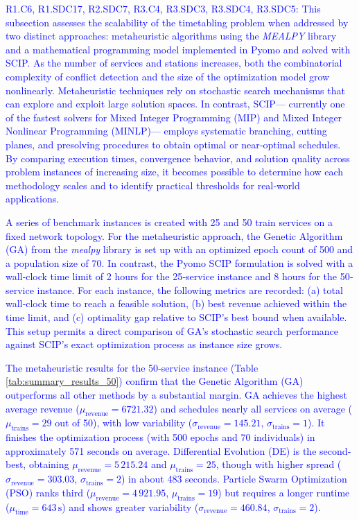 \documentclass[Afour,sagev,times]{sagej}
\newcommand{\primero}[1]{\textcolor{blue}{#1}}
\begin{document}
\primero{R1.C6, R1.SDC17, R2.SDC7, R3.C4, R3.SDC3, R3.SDC4, R3.SDC5: 
This subsection assesses the scalability of the timetabling problem when addressed by two distinct approaches: metaheuristic algorithms using the \textit{MEALPY} library and a mathematical programming model implemented in Pyomo and solved with \gls{SCIP}. As the number of services and stations increases, both the combinatorial complexity of conflict detection and the size of the optimization model grow nonlinearly. Metaheuristic techniques rely on stochastic search mechanisms that can explore and exploit large solution spaces. In contrast, SCIP— currently one of the fastest solvers for Mixed Integer Programming (MIP) and Mixed Integer Nonlinear Programming (MINLP)— employs systematic branching, cutting planes, and presolving procedures to obtain optimal or near‐optimal schedules. By comparing execution times, convergence behavior, and solution quality across problem instances of increasing size, it becomes possible to determine how each methodology scales and to identify practical thresholds for real‐world applications.
}

\primero{
A series of benchmark instances is created with 25 and 50 train services on a fixed network topology. For the metaheuristic approach, the Genetic Algorithm (GA) from the \textit{mealpy} library is set up with an optimized epoch count of 500 and a population size of 70. In contrast, the Pyomo SCIP formulation is solved with a wall‐clock time limit of 2 hours for the 25‐service instance and 8 hours for the 50‐service instance. For each instance, the following metrics are recorded: (a) total wall‐clock time to reach a feasible solution, (b) best revenue achieved within the time limit, and (c) optimality gap relative to SCIP’s best bound when available. This setup permits a direct comparison of GA’s stochastic search performance against SCIP’s exact optimization process as instance size grows.
}

\primero{
The metaheuristic results for the 50‐service instance (Table \ref{tab:summary_results_50}) confirm that the Genetic Algorithm (GA) outperforms all other methods by a substantial margin. GA achieves the highest average revenue (\(\mu_{\text{revenue}} = 6721.32\)) and schedules nearly all services on average (\(\mu_{\text{trains}} = 29\) out of 50), with low variability (\(\sigma_{\text{revenue}} = 145.21\), \(\sigma_{\text{trains}} = 1\)). It finishes the optimization process (with 500 epochs and 70 individuals) in approximately 571 seconds on average. Differential Evolution (DE) is the second‐best, obtaining \(\mu_{\text{revenue}} = 5\,215.24\) and \(\mu_{\text{trains}} = 25\), though with higher spread (\(\sigma_{\text{revenue}} = 303.03\), \(\sigma_{\text{trains}} = 2\)) in about 483 seconds. Particle Swarm Optimization (PSO) ranks third (\(\mu_{\text{revenue}} = 4\,921.95\), \(\mu_{\text{trains}} = 19\)) but requires a longer runtime (\(\mu_{\text{time}} = 643\,\text{s}\)) and shows greater variability (\(\sigma_{\text{revenue}} = 460.84\), \(\sigma_{\text{trains}} = 2\)). 
}
\end{document}
